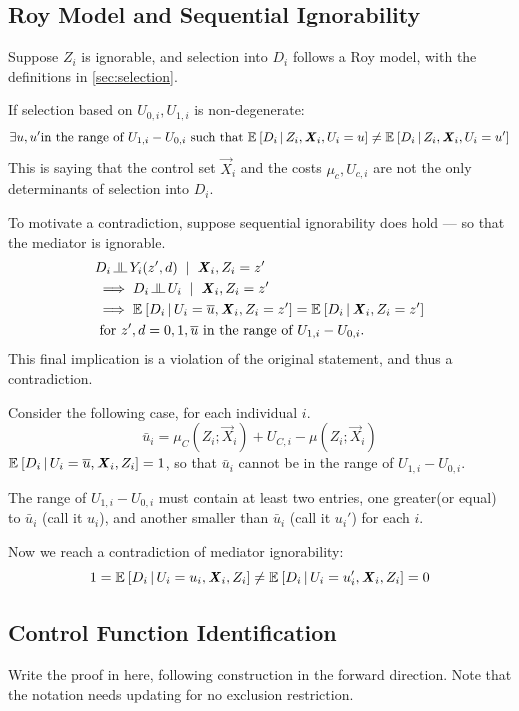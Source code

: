
\subsection{Roy Model and Sequential Ignorability}
\label{appendix:roy-seq-ig}
Suppose $Z_i$ is ignorable, and selection into $D_i$ follows a Roy model, with the definitions in \autoref{sec:selection}.

If selection based on $U_{0,i}, U_{1,i}$ is non-degenerate:
\[ \exists u, u' \text{in the range of $U_{1,i}- U_{0,i}$ such that }
    \mathbb{E}_{} \left[ D_i \, \middle\vert \, Z_i, \boldsymbol{\mathit{X}}_i, U_i = u \right]
    \neq \mathbb{E}_{} \left[ D_i \, \middle\vert \, Z_i, \boldsymbol{\mathit{X}}_i, U_i = u' \right] \]
This is saying that the control set $\vec X_i$ and the costs $\mu_c, U_{c,i}$ are not the only determinants of selection into $D_i$.

To motivate a contradiction, suppose sequential ignorability does hold --- so that the mediator is ignorable.
\begin{align*}
    & D_i \indep Y_i(z', d) \;\; | \;\; \vec X_i, Z_i = z' \\
    &\implies D_i \indep U_i \;\; | \;\; \vec X_i, Z_i = z' \\
    &\implies \Egiven{D_i}{U_i = \bar u, \vec X_i, Z_i = z'}
    = \Egiven{D_i}{\vec X_i, Z_i = z'} \\
    &    \textnormal{ for } z', d = 0, 1, \bar u \text{ in the range of $U_{1,i}- U_{0,i}$.}
\end{align*}
This final implication is a violation of the original statement, and thus a contradiction.

Consider the following case, for each individual $i$.
\[ \bar u_i = \mu_C(Z_i ; \vec X_i) + U_{C,i} - \mu(Z_i ; \vec X_i) \]
$\mathbb{E}_{} \left[ D_i \, \middle\vert \, U_i = \overline{u}, \boldsymbol{\mathit{X}}_i, Z_i \right] = 1$, so that $\bar u_i$ cannot be in the range of $U_{1,i}- U_{0,i}$.

The range of $U_{1,i}- U_{0,i}$ must contain at least two entries, one greater(or equal) to $\bar u_i$ (call it $u_i$), and another smaller than $\bar u_i$ (call it $u_i'$) for each $i$.

Now we reach a contradiction of mediator ignorability:
\[ 1 = \mathbb{E}_{} \left[ D_i \, \middle\vert \, U_i = u_i, \boldsymbol{\mathit{X}}_i, Z_i \right] \neq 
\mathbb{E}_{} \left[ D_i \, \middle\vert \, U_i = u_i', \boldsymbol{\mathit{X}}_i, Z_i \right] = 0 \]

\subsection{Control Function Identification}
\label{appendix:controlfun-proof}
Write the proof in here, following \cite{vytlacil2002independence} construction in the forward direction.
Note that the notation needs updating for no exclusion restriction.


